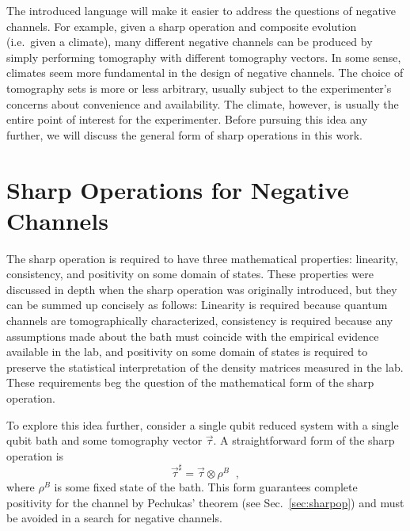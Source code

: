 The introduced language will make it easier to address the questions of negative channels.  For example, given a sharp operation and composite evolution (i.e.\ given a climate), many different negative channels can be produced by simply performing tomography with different tomography vectors.  In some sense, climates seem more fundamental in the design of negative channels.  The choice of tomography sets is more or less arbitrary, usually subject to the experimenter's concerns about convenience and availability.  The climate, however, is usually the entire point of interest for the experimenter.  Before pursuing this idea any further, we will discuss the general form of sharp operations in this work.
  
\section{Sharp Operations for Negative Channels}
\label{sec:negsharpop}

The sharp operation is required to have three mathematical properties: linearity, consistency, and positivity on some domain of states.  These properties were discussed in depth when the sharp operation was originally introduced, but they can be summed up concisely as follows:  Linearity is required because quantum channels are tomographically characterized, consistency is required because any assumptions made about the bath must coincide with the empirical evidence available in the lab, and positivity on some domain of states is required to preserve the statistical interpretation of the density matrices measured in the lab.  These requirements beg the question of the mathematical form of the sharp operation.

To explore this idea further, consider a single qubit reduced system with a single qubit bath and some tomography vector $\vec{\tau}$.  A straightforward form of the sharp operation is
\begin{equation}
\vec{\tau}^\sharp = \vec{\tau}\otimes \rho^B\;\;,
\end{equation}
where $\rho^B$ is some fixed state of the bath.  This form guarantees complete positivity for the channel by Pechukas' theorem (see Sec.\ \ref{sec:sharpop}) and must be avoided in a search for negative channels.  

